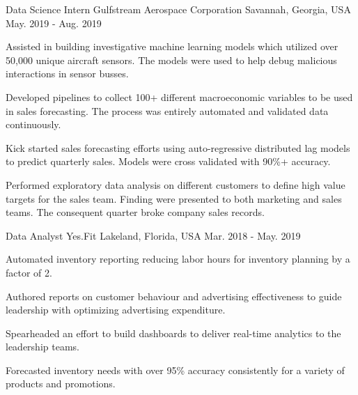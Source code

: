 \begin{cventries}
  \cventry
    {Data Science Intern} %
    {Gulfstream Aerospace Corporation} %
    {Savannah, Georgia, USA} %
    {May. 2019 - Aug. 2019} %
    {
      \begin{cvitems} %
        \item {Assisted in building investigative machine learning models which utilized over 50,000 unique aircraft sensors. The models were used to help debug malicious interactions in sensor busses.}
        \item {Developed pipelines to collect 100+ different macroeconomic variables to be used in sales forecasting. The process was entirely automated and validated data continuously.}
        \item {Kick started sales forecasting efforts using auto-regressive distributed lag models to predict quarterly sales. Models were cross validated with 90\%+ accuracy.}
        \item {Performed exploratory data analysis on different customers to define high value targets for the sales team. Finding were presented to both marketing and sales teams. The consequent quarter broke company sales records.}
      \end{cvitems}
    }

  \cventry
    {Data Analyst} %
    {Yes.Fit} %
    {Lakeland, Florida, USA} %
    {Mar. 2018 - May. 2019} %
    {
      \begin{cvitems} %
        \item {Automated inventory reporting reducing labor hours for inventory planning by a factor of 2.}
        \item {Authored reports on customer behaviour and advertising effectiveness to guide leadership with optimizing advertising expenditure.}
        \item {Spearheaded an effort to build dashboards to deliver real-time analytics to the leadership teams.}
        \item {Forecasted inventory needs with over 95\% accuracy consistently for a variety of products and promotions.}
      \end{cvitems}
    }

\end{cventries}

